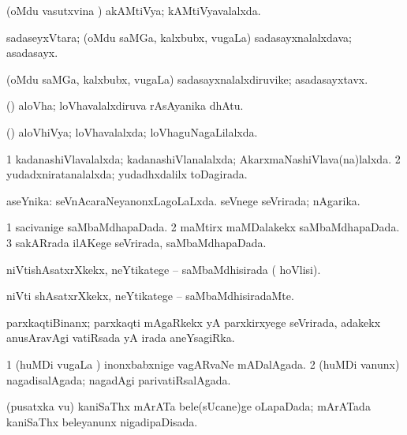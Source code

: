 \bentry
{}
\gl{\gu}
\bmng
(oMdu vasutxvina \vi) akAMtiVya; kAMtiVyavalalxda. 
\emng
\eentry

\bentry
{}
\gl{\nA}
\bmng
sadaseyxVtara; (oMdu saMGa, kalxbubx, \mo vugaLa) sadasayxnalalxdava; asadasayx. 
\emng
\eentry

\bentry
{}
\gl{\nA}
\bmng
(oMdu saMGa, kalxbubx, \mo vugaLa) sadasayxnalalxdiruvike; asadasayxtavx. 
\emng
\eentry

\bentry
{}
\gl{\nA}
\bmng
(\ravi) aloVha; loVhavalalxdiruva rAsAyanika dhAtu. 
\emng
\eentry

\bentry
{}
\gl{\gu}
\bmng
(\ravi) aloVhiVya; loVhavalalxda; loVhaguNagaLilalxda. 
\emng
\eentry

\bentry
{}
\gl{\gu}
\bmng
\bnum
\num{1} kadanashiVlavalalxda; kadanashiVlanalalxda; AkarxmaNashiVlava(na)lalxda. 
\num{2} yudadxniratanalalxda; yudadhxdalilx toDagirada. 
\enum
\emng
\eentry

\bentry
{}
\gl{\gu}
\bmng
aseYnika: 
\banum
{} seVnAcaraNeyanonxLagoLaLxda. 
 seVnege seVrirada; nAgarika. 
\eanum
\emng
\eentry

\bentry
{}
\gl{\gu}
\bmng
\bnum
\num{1} sacivanige saMbaMdhapaDada. 
\num{2} maMtirx maMDalakekx saMbaMdhapaDada. 
\num{3} sakARrada ilAKege seVrirada, saMbaMdhapaDada. 
\enum
\emng
\eentry

\bentry
{}
\gl{\gu}
\bmng
niVtishAsatxrXkekx, neYtikatege -- saMbaMdhisirada ( hoVlisi). 
\emng
\eentry

\bentry
{}
\gl{\kirxvi}
\bmng
niVti shAsatxrXkekx, neYtikatege -- saMbaMdhisiradaMte. 
\emng
\eentry

\bentry
{}
\gl{\gu}
\bmng
parxkaqtiBinanx; parxkaqti mAgaRkekx yA parxkirxyege seVrirada, adakekx anusAravAgi vatiRsada yA irada aneYsagiRka. 
\emng
\eentry

\bentry
{}
\gl{\gu}
\bmng
\bnum
\num{1} (huMDi \mo vugaLa \vi) inonxbabxnige vagARvaNe mADalAgada. 
\num{2} (huMDi \mo vanunx) nagadisalAgada; nagadAgi parivatiRsalAgada. 
\enum
\emng
\eentry

\bentry
{}
\gl{\gu}
\bmng
(pusatxka \mo vu) kaniSaThx mArATa bele(sUcane)ge oLapaDada; mArATada kaniSaThx beleyanunx nigadipaDisada. 
\emng
\eentry

